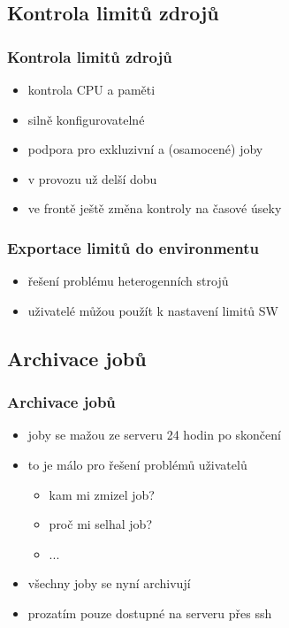 \documentclass[pdftex,aspectratio=169]{beamer}
\begin{document}
\subsection{Kontrola limitů zdrojů}

\begin{frame}
	\frametitle{Kontrola limitů zdrojů}
	\begin{itemize}
		\item{kontrola CPU a paměti}
		\item{silně konfigurovatelné}
		\item{podpora pro exkluzivní a (osamocené) joby}
		\item{v provozu už delší dobu}
		\item{ve frontě ještě změna kontroly na časové úseky}
	\end{itemize}
\end{frame}

\begin{frame}
	\frametitle{Exportace limitů do environmentu}
	\begin{itemize}
		\item{řešení problému heterogenních strojů}
		\item{uživatelé můžou použít k nastavení limitů SW}
	\end{itemize}
\end{frame}

\subsection{Archivace jobů}

\begin{frame}
	\frametitle{Archivace jobů}
	\begin{itemize}
		\item{joby se mažou ze serveru 24 hodin po skončení}
		\item{to je málo pro řešení problémů uživatelů}
		\begin{itemize}
			\item{kam mi zmizel job?}
			\item{proč mi selhal job?}
			\item{...}
		\end{itemize}
		\item{všechny joby se nyní archivují}
		\item{prozatím pouze dostupné na serveru přes ssh}
	\end{itemize}
\end{frame}
\end{document}
